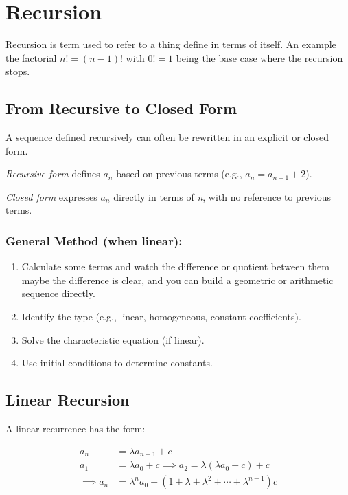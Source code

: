 \newpage
\section{Recursion}

Recursion is term used to refer to a thing define in terms
of itself. An example the factorial \(n! = (n - 1)\)! with \(0! = 1\) being the
base case where the recursion stops.

\subsection{From Recursive to Closed Form}

A sequence defined recursively can often be rewritten in an explicit or closed form.

\emph{Recursive form} defines \( a_n \) based on previous terms (e.g., \( a_n = a_{n-1} + 2 \)).

\emph{Closed form} expresses \( a_n \) directly in terms of \emph{n}, with no reference to previous terms.

\subsubsection{General Method (when linear):}

\begin{enumerate}

    \item Calculate some terms and watch the difference or quotient between them
          maybe the difference is clear, and you can build a geometric or arithmetic sequence directly.

    \item Identify the type (e.g., linear, homogeneous, constant coefficients).

    \item Solve the characteristic equation (if linear).
    
    \item Use initial conditions to determine constants.

\end{enumerate}

\subsection{Linear Recursion}

A linear recurrence has the form:

\begin{align*}
    a_n & = \lambda a_{n -1} + c \\
    a_1 & = \lambda a_0 + c \implies a_2 = \lambda (\lambda a_0 + c) + c \\
    \implies a_n & = \lambda^n a_0 + (1 + \lambda + \lambda^2 + \cdots + \lambda^{n - 1})c
\end{align*}

